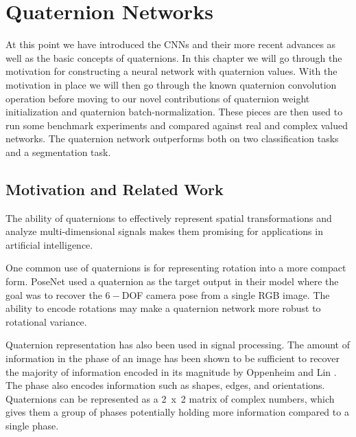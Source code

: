 \chapter{Quaternion Networks}
At this point we have introduced the CNNs and their more recent advances as well as the basic concepts of quaternions.
In this chapter we will go through the motivation for constructing a neural network with quaternion values.
With the motivation in place we will then go through the known quaternion convolution operation before moving to our novel contributions of quaternion weight initialization and quaternion batch-normalization.
These pieces are then used to run some benchmark experiments and compared against real and complex valued networks.
The quaternion network outperforms both on two classification tasks and a segmentation task.


\section{Motivation and Related Work}
The ability of quaternions to effectively represent spatial transformations and analyze multi-dimensional signals makes them promising for applications in artificial intelligence.

One common use of quaternions is for representing rotation into a more compact form. 
PoseNet \cite{kendall2015posenet} used a quaternion as the target output in their model where the goal was to recover the $6-$DOF camera pose from a single RGB image.
The ability to encode rotations may make a quaternion network more robust to rotational variance.

Quaternion representation has also been used in signal processing.  
The amount of information in the phase of an image has been shown to be sufficient to recover the majority of information encoded in its magnitude by Oppenheim and Lin \cite{oppenheim1981importance}.
The phase also encodes information such as shapes, edges, and orientations.
Quaternions can be represented as a 2~x~2 matrix of complex numbers, which gives them a group of phases potentially holding more information compared to a single phase.

